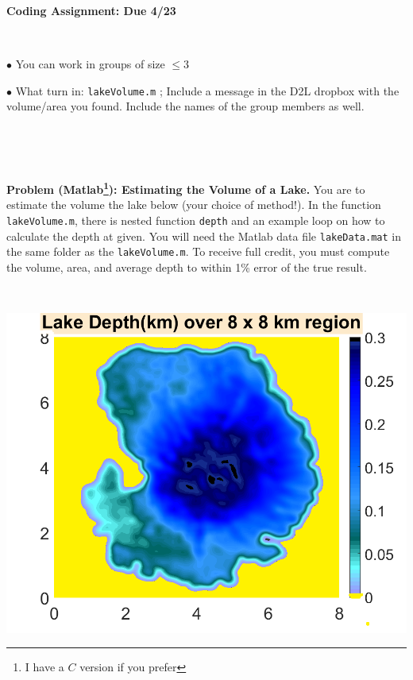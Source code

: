 \documentclass[12pt,letterpaper]{article}
\begin{document}
\begin{flushleft}
\thispagestyle{empty} 


\textbf{\Large Coding Assignment: Due 4/23}  

\

$\bullet$ You can work in groups of size $\leq 3$ 

$\bullet$ What turn in:   \texttt{lakeVolume.m} ;  Include a message in the D2L dropbox with the volume/area you found. Include the names of the group members as well. 



\

\


\textbf{Problem  (Matlab\footnote{I have a $C$ version if you prefer}):  Estimating the Volume of a Lake.}   You are to estimate the volume the lake below (your choice of method!).  In the function \texttt{lakeVolume.m}, there is nested function \texttt{depth} and an example loop on how to calculate the depth at given.   You will need the Matlab data file \texttt{lakeData.mat} in the same folder as the \texttt{lakeVolume.m}.  To receive full credit,  you must compute the volume, area, and average depth to within 1\% error of the true result.  



\

\includegraphics[scale=0.5]{lakeFig.png}

\end{flushleft}
\end{document}
